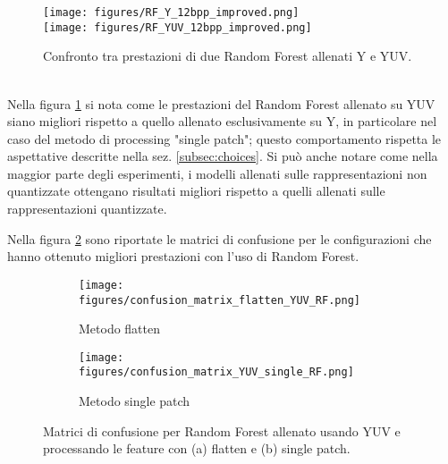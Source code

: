\begin{figure}
    \centering
    \texttt{[image: figures/RF\_Y\_12bpp\_improved.png]}\\[0.5cm]
    \texttt{[image: figures/RF\_YUV\_12bpp\_improved.png]}
    \caption{Confronto tra prestazioni di due Random Forest allenati Y e YUV.}
    \label{fig:RF_YvsYUV}
\end{figure}
\\
Nella figura \ref{fig:RF_YvsYUV} si nota come le prestazioni del Random Forest allenato su YUV siano  migliori rispetto a quello allenato esclusivamente su Y, in particolare nel caso del metodo di processing "single patch"; questo comportamento rispetta le aspettative descritte nella sez. \ref{subsec:choices}. Si può anche notare come nella maggior parte degli esperimenti, i modelli allenati sulle rappresentazioni non quantizzate ottengano risultati migliori rispetto a quelli allenati sulle rappresentazioni quantizzate.

Nella figura \ref{fig:RF_YUV_confusion} sono riportate le matrici di confusione per le configurazioni che hanno ottenuto migliori prestazioni con l'uso di Random Forest.
\begin{figure}[H]
    \centering
    \begin{subfigure}[b]{0.8\textwidth}
        \centering
        \texttt{[image: figures/confusion\_matrix\_flatten\_YUV\_RF.png]}
        \caption{Metodo flatten}
    \end{subfigure}
    \hfill
    \begin{subfigure}[b]{0.8\textwidth}
        \centering
        \texttt{[image: figures/confusion\_matrix\_YUV\_single\_RF.png]}
        \caption{Metodo single patch}
    \end{subfigure}
    \caption{Matrici di confusione per Random Forest allenato usando YUV e processando le feature con (a) flatten e (b) single patch.}
    \label{fig:RF_YUV_confusion}
\end{figure}

